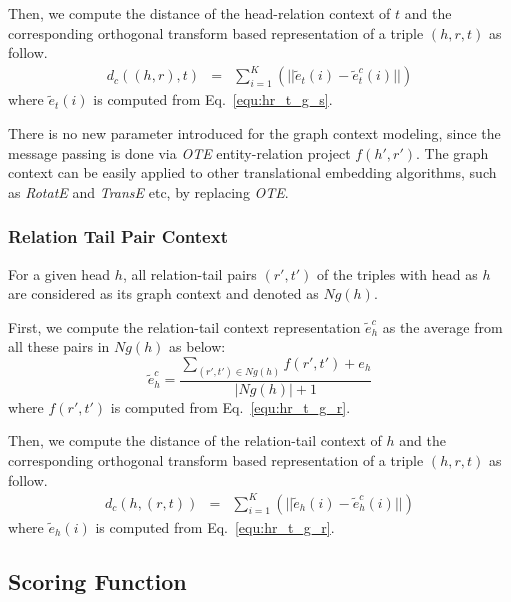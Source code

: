\documentclass[11pt,a4paper]{article}
\begin{document}
Then, we compute the distance of the head-relation context of $t$ and the corresponding orthogonal transform based representation of a triple $(h,r,t)$ as follow.
 \begin{eqnarray}
    d_c((h,r),t) \!\!\!\!&=&\!\! \sum_{i=1}^K ( || \tilde{e}_t(i) - \tilde{e}_t^c(i)||) \label{equ:score_cxt_t}
\end{eqnarray}
where $\tilde{e}_t(i)$ is computed from Eq.~\ref{equ:hr_t_g_s}.

There is no new parameter introduced for the graph context modeling, since the message passing is done via {\it OTE} entity-relation project $f(h', r')$. The graph context can be easily applied to other translational embedding algorithms, such as {\it RotatE} and {\it TransE} etc, by replacing {\it OTE}.

\subsubsection{Relation Tail Pair Context}

For a given head $h$, all relation-tail pairs $(r', t')$ of the triples with head as $h$ are considered as its graph context and denoted as $Ng(h)$.

First, we compute the relation-tail context representation $\tilde{e}_h^c$ as the average from all these pairs in $Ng(h)$ as below:
\begin{equation}
    \tilde{e}_h^c  = \frac{\sum_{(r',t')\in Ng(h)} f(r', t') + e_h}{|Ng(h)| + 1}\label{equ:cxh}
\end{equation}
where $f(r', t')$ is computed from Eq.~\ref{equ:hr_t_g_r}.

Then, we compute the distance of the relation-tail context of $h$ and the corresponding orthogonal transform based representation of a triple $(h,r,t)$ as follow.
 \begin{eqnarray}
    d_c(h,(r,t)) \!\!\!\!&=&\!\! \sum_{i=1}^K ( || \tilde{e}_h(i) - \tilde{e}_h^c(i)||) \label{equ:score_cxt_h} 
\end{eqnarray}
where $\tilde{e}_h(i)$ is computed from Eq.~\ref{equ:hr_t_g_r}.












\subsection{Scoring Function}
\end{document}
